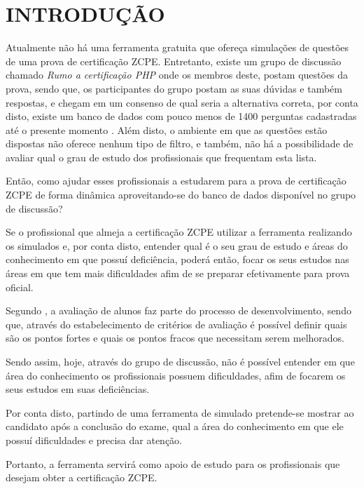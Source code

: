 \chapter{INTRODUÇÃO}
\label{chp:intro}

Atualmente não há uma ferramenta gratuita que ofereça simulações de questões de 
uma prova de certificação \ac{ZCPE}. Entretanto, existe um 
grupo de discussão chamado \textit{Rumo a certificação PHP} onde os membros
deste, postam questões da prova, sendo que, os participantes do grupo postam as suas dúvidas 
e também respostas, e chegam em um consenso de qual seria a alternativa correta,
por conta disto, existe um banco de dados com pouco menos de 1400 perguntas 
cadastradas até o presente momento \cite{googleGroupsRumoACertificaoPHP}. Além
disto, o ambiente em que as questões estão dispostas não oferece nenhum tipo de 
filtro, e também, não há a possibilidade de avaliar qual o grau de estudo dos 
profissionais que frequentam esta lista.

Então, como ajudar esses profissionais a estudarem para a prova de certificação
\acs{ZCPE} de forma dinâmica aproveitando-se do banco de dados disponível no
grupo de discussão?


Se o profissional que almeja a certificação \acs{ZCPE} utilizar a ferramenta
realizando os simulados e, por conta disto, entender qual é o seu grau de estudo e áreas 
do conhecimento em que possuí deficiência, poderá então, focar os seus estudos 
nas áreas em que tem mais dificuldades afim de se preparar efetivamente para 
prova oficial.


Segundo , a avaliação de 
alunos faz parte do processo de desenvolvimento, sendo que, através do estabelecimento 
de critérios de avaliação é possível definir quais são os pontos fortes e quais
os pontos fracos que necessitam serem melhorados.

Sendo assim, hoje, através do grupo de discussão, não é possível entender em 
que área do conhecimento os profissionais possuem dificuldades, afim de focarem
os seus estudos em suas deficiências.

Por conta disto, partindo de uma ferramenta de simulado pretende-se mostrar ao
candidato após a conclusão do exame, qual a área do conhecimento em que ele 
possuí dificuldades e precisa dar atenção.

Portanto, a ferramenta servirá como apoio de
estudo para os profissionais que desejam obter a certificação \acs{ZCPE}.

